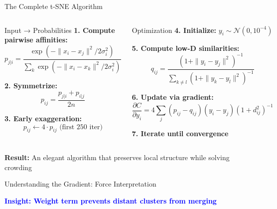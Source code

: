 \documentclass[aspectratio=169]{beamer}
\newcommand{\conceptbox}[2]{\colorbox{#1!20}{\textcolor{#1}{\textbf{#2}}}}
\newcommand{\insight}[1]{\conceptbox{blue}{Insight: #1}}
\begin{document}
\begin{frame}{The Complete t-SNE Algorithm}
\vspace{-3mm}
\begin{columns}
\begin{block}{Input → Probabilities}
\textbf{1. Compute pairwise affinities:}
\small
$$p_{j|i} = \frac{\exp(-\|x_i-x_j\|^2/2\sigma_i^2)}{\sum_k \exp(-\|x_i-x_k\|^2/2\sigma_i^2)}$$
\normalsize

\textbf{2. Symmetrize:}
$$p_{ij} = \frac{p_{j|i} + p_{i|j}}{2n}$$

\textbf{3. Early exaggeration:}
$$p_{ij} \leftarrow 4 \cdot p_{ij} \text{ (first 250 iter)}$$
\end{block}

\begin{block}{Optimization}
\textbf{4. Initialize:} $y_i \sim \mathcal{N}(0, 10^{-4})$

\textbf{5. Compute low-D similarities:}
\small
$$q_{ij} = \frac{(1+\|y_i-y_j\|^2)^{-1}}{\sum_{k \neq l}(1+\|y_k-y_l\|^2)^{-1}}$$
\normalsize

\textbf{6. Update via gradient:}
\small
$$\frac{\partial C}{\partial y_i} = 4\sum_j (p_{ij} - q_{ij})(y_i - y_j)(1 + d_{ij}^2)^{-1}$$
\normalsize

\textbf{7. Iterate until convergence}
\end{block}
\end{columns}

\vspace{3mm}
\begin{center}
\colorbox{blue!20}{\parbox{0.9\textwidth}{\centering
\textbf{Result:} An elegant algorithm that preserves local structure while solving crowding}}
\end{center}
\end{frame}

\begin{frame}{Understanding the Gradient: Force Interpretation}
\begin{center}
\end{center}

\insight{Weight term prevents distant clusters from merging}
\end{frame}
\end{document}
